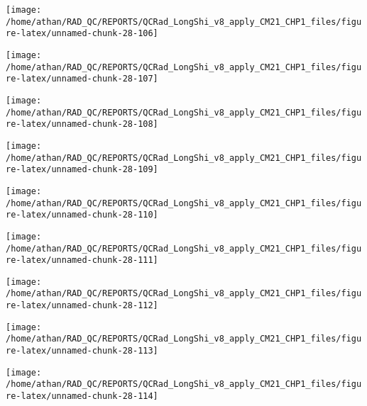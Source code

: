 \documentclass[
  10pt,
  a4paper,oneside]{article}
\begin{document}
\begin{center}\texttt{[image: /home/athan/RAD\_QC/REPORTS/QCRad\_LongShi\_v8\_apply\_CM21\_CHP1\_files/figure-latex/unnamed-chunk-28-106]} \end{center}

\begin{center}\texttt{[image: /home/athan/RAD\_QC/REPORTS/QCRad\_LongShi\_v8\_apply\_CM21\_CHP1\_files/figure-latex/unnamed-chunk-28-107]} \end{center}

\begin{center}\texttt{[image: /home/athan/RAD\_QC/REPORTS/QCRad\_LongShi\_v8\_apply\_CM21\_CHP1\_files/figure-latex/unnamed-chunk-28-108]} \end{center}

\begin{center}\texttt{[image: /home/athan/RAD\_QC/REPORTS/QCRad\_LongShi\_v8\_apply\_CM21\_CHP1\_files/figure-latex/unnamed-chunk-28-109]} \end{center}

\begin{center}\texttt{[image: /home/athan/RAD\_QC/REPORTS/QCRad\_LongShi\_v8\_apply\_CM21\_CHP1\_files/figure-latex/unnamed-chunk-28-110]} \end{center}

\begin{center}\texttt{[image: /home/athan/RAD\_QC/REPORTS/QCRad\_LongShi\_v8\_apply\_CM21\_CHP1\_files/figure-latex/unnamed-chunk-28-111]} \end{center}

\begin{center}\texttt{[image: /home/athan/RAD\_QC/REPORTS/QCRad\_LongShi\_v8\_apply\_CM21\_CHP1\_files/figure-latex/unnamed-chunk-28-112]} \end{center}

\begin{center}\texttt{[image: /home/athan/RAD\_QC/REPORTS/QCRad\_LongShi\_v8\_apply\_CM21\_CHP1\_files/figure-latex/unnamed-chunk-28-113]} \end{center}

\begin{center}\texttt{[image: /home/athan/RAD\_QC/REPORTS/QCRad\_LongShi\_v8\_apply\_CM21\_CHP1\_files/figure-latex/unnamed-chunk-28-114]} \end{center}
\end{document}
